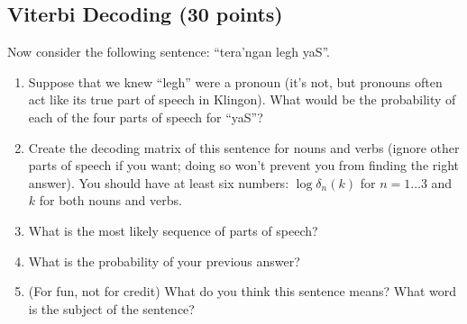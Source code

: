 \documentclass[11pt,twoside]{article}
\begin{document}
\subsection{Viterbi Decoding (30 points)}

Now consider the following sentence: ``tera'ngan legh yaS''.  

\begin{enumerate}
\item Suppose that we knew ``legh'' were a pronoun (it's not, but pronouns often act like its true part of speech in Klingon).  What would be the probability of each of the four parts of speech for ``yaS''?

\item Create the decoding matrix of this sentence for nouns and verbs (ignore other parts of speech if you want; doing so won't prevent you from finding the right answer).  You should have at least six numbers: $\log \delta_{n}(k)$ for $n=1\dots3$ and $k$ for both nouns and verbs.

\item What is the most likely sequence of parts of speech?

\item What is the probability of your previous answer?

\item (For fun, not for credit) What do you think this sentence means?  What word is the subject of the sentence?

\end{enumerate}
\end{document}
